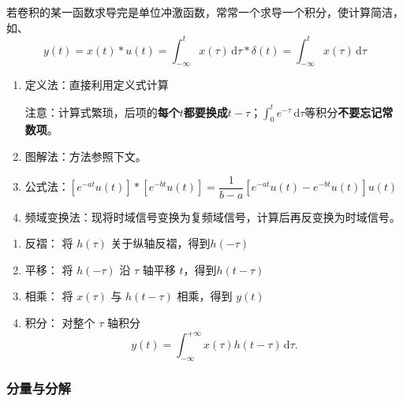 \documentclass[UTF8,fontset=fandol,zihao=5]{ctexart}
\newcommand{\dd}{\,\mathrm{d}}
\begin{document}
\begin{enumerate}
\begin{methodbox}[卷积性质]
\begin{enumerate}[label=\arabic*.]
\begin{itemize}
  \end{itemize}
  若卷积的某一函数求导完是单位冲激函数，常常一个求导一个积分，使计算简洁，如、
  \[
  y(t) = x(t) \ast u(t) = \int_{-\infty}^{t}x(\tau)\dd\tau \ast \delta(t) = \int_{-\infty}^{t}x(\tau)\dd\tau
  \]
\end{enumerate}
    \end{methodbox}
    \begin{methodbox}[【技巧】计算卷积方法选择]
      \begin{enumerate}
        \item 定义法：直接利用定义式计算
        
        注意：计算式繁琐，后项的\textbf{每个$t$都要换成$t-\tau$}；$\int_{0}^{t}e^{-\tau}\dd \tau$等积分\textbf{不要忘记常数项}。
        
        \item 图解法：方法参照下文。
        \item 公式法：$\displaystyle\left[e^{-at}u(t)\right]\ast\left[e^{-bt}u(t)\right]=\dfrac{1}{b-a}[e^{-at}u(t)-e^{-bt}u(t)]u(t)$
        \item 频域变换法：现将时域信号变换为复频域信号，计算后再反变换为时域信号。
      \end{enumerate}
    \end{methodbox}
    \begin{methodbox}[【技巧】图解法]
      \begin{enumerate}[label=(\arabic*)]
        \item 反褶： 将 \(h(\tau)\) 关于纵轴反褶，得到\(h(-\tau)\)
      
        \item 平移： 将 \(h(-\tau)\) 沿 \(\tau\) 轴平移 \(t\)，得到\(h(t-\tau)\)
        
        \item 相乘： 将 \(x(\tau)\) 与 \(h(t-\tau)\) 相乘，得到 \(y(t)\)
        
        \item 积分： 对整个 \(\tau\) 轴积分
        \[
        y(t)
        =
        \int_{-\infty}^{+\infty}
        x(\tau)h(t-\tau)\dd\tau.
        \]
      \end{enumerate}
    \end{methodbox}
\end{enumerate}

\subsubsection{分量与分解}
\end{document}
